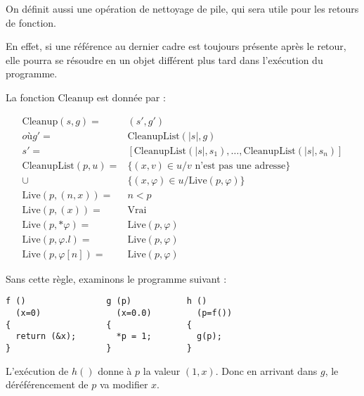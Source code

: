On définit aussi une opération de nettoyage de pile, qui sera utile pour les
retours de fonction.

En effet, si une référence au dernier cadre est toujours présente après
le retour, elle pourra se résoudre en un objet différent plus tard dans
l'exécution du programme.

La fonction $\mathrm{Cleanup}$ est donnée par :

\def\cleanuplist#1#2{\mathrm{CleanupList}(#1, #2)}
\def\cllive#1#2{\mathrm{Live}(#1, #2)}

\begin{align*}
  \mathrm{Cleanup}(s, g)  = & (s', g') \\
                    où g' = & \cleanuplist{|s|}{g} \\
                       s' = & [\cleanuplist{|s|}{s_1},
                            …, \cleanuplist{|s|}{s_n}] \\
       \cleanuplist{p}{u} = & \{(x, v) ∈ u / v\mbox{ n'est pas une adresse} \} \\
                       \cup & \{(x, φ) ∈ u / \cllive{p}{φ} \} \\
    \cllive{p}{(n, x)} = & n < p \\
    \cllive{p}{(x)}    = & \mathrm{Vrai} \\
    \cllive{p}{*φ}     = & \cllive{p}{φ} \\
    \cllive{p}{φ.l}    = & \cllive{p}{φ} \\
    \cllive{p}{φ[n]}   = & \cllive{p}{φ}
\end{align*}

Sans cette règle, examinons le programme suivant :

\begin{Verbatim}
f ()                g (p)           h ()
  (x=0)               (x=0.0)         (p=f())
{                   {               {
  return (&x);        *p = 1;         g(p);
}                   }               }
\end{Verbatim}

L'exécution de $h()$ donne à $p$ la valeur $(1, x)$. Donc en arrivant dans $g$, le
déréférencement de $p$ va modifier $x$.

